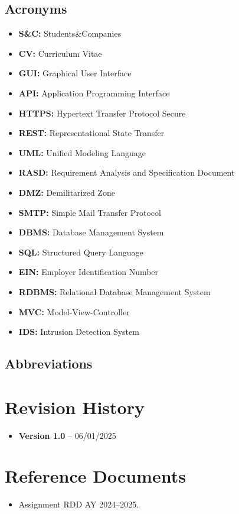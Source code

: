 \subsection{Acronyms}\label{subsec:acronyms}
\begin{itemize}
    \item \textbf{S\&C:} Students\&Companies
    \item \textbf{CV:} Curriculum Vitae
    \item \textbf{GUI:} Graphical User Interface
    \item \textbf{API:} Application Programming Interface
    \item \textbf{HTTPS:} Hypertext Transfer Protocol Secure
    \item \textbf{REST:} Representational State Transfer
    \item \textbf{UML:} Unified Modeling Language
    \item \textbf{RASD:} Requirement Analysis and Specification Document
    \item \textbf{DMZ:} Demilitarized Zone
    \item \textbf{SMTP:} Simple Mail Transfer Protocol
    \item \textbf{DBMS:} Database Management System
    \item \textbf{SQL:} Structured Query Language
    \item \textbf{EIN:} Employer Identification Number
    \item \textbf{RDBMS:} Relational Database Management System
    \item \textbf{MVC:} Model-View-Controller
    \item \textbf{IDS:} Intrusion Detection System
\end{itemize}

\subsection{Abbreviations}\label{subsec:abbreviations}

\section{Revision History}\label{sec:revision history}
\begin{itemize}
    \item \textbf{Version 1.0} – 06/01/2025
\end{itemize}
\section{Reference Documents}\label{sec:reference documents}
\begin{itemize}
    \item Assignment RDD AY 2024–2025.
\end{itemize}

